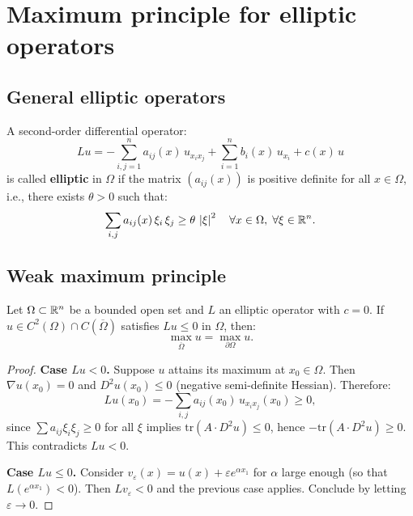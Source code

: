 \section{Maximum principle for elliptic operators}

\subsection{General elliptic operators}

\begin{definition}
A second-order differential operator:
\begin{equation}\label{eq:elliptic_operator}
    Lu = -\sum_{i,j=1}^{n} a_{ij}(x)\, u_{x_i x_j}
    + \sum_{i=1}^{n} b_i(x)\, u_{x_i} + c(x)\, u
\end{equation}
is called \textbf{elliptic} in $\Omega$ if the matrix $(a_{ij}(x))$ is
positive definite for all $x \in \Omega$, i.e., there exists $\theta > 0$
such that:
\[
    \sum_{i,j} a_{ij}(x)\, \xi_i\, \xi_j \geq \theta\, \left| \xi \right|^2
    \quad \forall x \in \Omega, \; \forall \xi \in \mathbb{R}^n.
\]
\end{definition}

\subsection{Weak maximum principle}

\begin{theorem}[Weak maximum principle --- case $c = 0$]
\label{thm:weak_max_elliptic}
Let $\Omega \subset \mathbb{R}^n$ be a bounded open set and $L$ an elliptic
operator with $c = 0$. If $u \in C^2(\Omega) \cap C(\overline{\Omega})$
satisfies $Lu \leq 0$ in $\Omega$, then:
\begin{equation}\label{eq:weak_max}
    \max_{\overline{\Omega}} u = \max_{\partial\Omega} u.
\end{equation}
\end{theorem}

\begin{proof}
\textbf{Case $Lu < 0$.} Suppose $u$ attains its maximum at
$x_0 \in \Omega$. Then $\nabla u(x_0) = 0$ and $D^2u(x_0) \leq 0$
(negative semi-definite Hessian). Therefore:
\[
    Lu(x_0) = -\sum_{i,j} a_{ij}(x_0)\, u_{x_ix_j}(x_0) \geq 0,
\]
since $\sum a_{ij} \xi_i\xi_j \geq 0$ for all $\xi$ implies
$\mathrm{tr}(A \cdot D^2u) \leq 0$, hence $-\mathrm{tr}(A \cdot D^2u) \geq 0$.
This contradicts $Lu < 0$.

\textbf{Case $Lu \leq 0$.} Consider
$v_\varepsilon(x) = u(x) + \varepsilon e^{\alpha x_1}$
for $\alpha$ large enough (so that $L(e^{\alpha x_1}) < 0$). Then
$Lv_\varepsilon < 0$ and the previous case applies. Conclude by letting
$\varepsilon \to 0$.
\end{proof}

